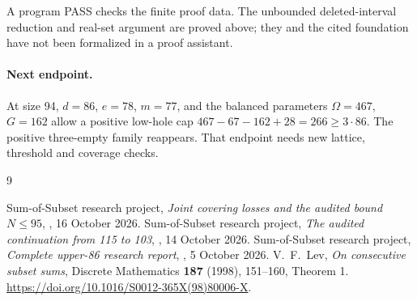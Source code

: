 \documentclass[11pt,a4paper]{article}
\begin{document}
A program PASS checks the finite proof data. The unbounded
deleted-interval reduction and real-set argument are proved above;
they and the cited foundation have not been formalized in a proof assistant.

\paragraph{Next endpoint.}
At size 94, $d=86$, $e=78$, $m=77$, and the balanced parameters
$\Omega=467$, $G=162$ allow a positive low-hole cap
$467-67-162+28=266\ge3\cdot86$. The positive three-empty family
reappears. That endpoint needs new lattice, threshold and coverage checks.

\begin{thebibliography}{9}
\raggedright
{} Sum-of-Subset research project,
\emph{Joint covering losses and the audited bound $N\le95$},
, 16 October 2026.
 Sum-of-Subset research project,
\emph{The audited continuation from 115 to 103},
, 14 October 2026.
 Sum-of-Subset research project,
\emph{Complete upper-86 research report},
, 5 October 2026.
 V.~F.~Lev, \emph{On consecutive subset sums},
Discrete Mathematics \textbf{187} (1998), 151--160, Theorem 1.
\url{https://doi.org/10.1016/S0012-365X(98)80006-X}.
\end{thebibliography}
\end{document}

